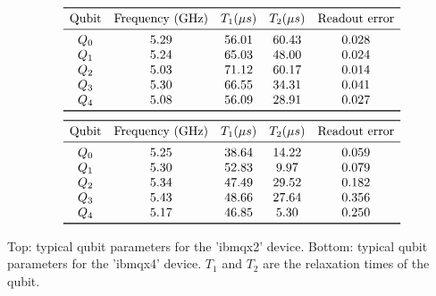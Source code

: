 \begin{center}
\begin{table}[h!]
\[
\begin{array}{*{5}c}
\toprule
\text{Qubit} 	&	\text{Frequency (GHz)}	&	T_1 ( \mu s)	&	T_2 ( \mu s)	&	\text{Readout error}	\\
\midrule
Q_0	&	5.29	&	56.01	&	60.43	&	0.028 \\
Q_1	&	5.24	&	65.03	&	48.00	&	0.024 \\
Q_2	&	5.03	&	71.12	&	60.17	&	0.014 \\
Q_3	&	5.30	&	66.55	&	34.31	&	0.041 \\
Q_4	&	5.08	&	56.09	&	28.91	&	0.027 \\
\bottomrule

\end{array}
\]
\[
\begin{array}{*{5}c}
\toprule
\text{Qubit} 	&	\text{Frequency (GHz)}	&	T_1 ( \mu s)	&	T_2 ( \mu s)	&	\text{Readout error}	\\
\midrule
Q_0	&	5.25	&	38.64	&	14.22	&	0.059 \\
Q_1	&	5.30	&	52.83	&	9.97	&	0.079 \\
Q_2	&	5.34	&	47.49	&	29.52	&	0.182 \\
Q_3	&	5.43	&	48.66	&	27.64	&	0.356\\
Q_4	&	5.17	&	46.85	&	5.30	&	0.250 \\
\bottomrule

\end{array}
\]

\caption{Top: typical qubit parameters for the 'ibmqx2' device. Bottom: typical qubit parameters for the 'ibmqx4' device. $T_1$ and $T_2$ are the relaxation times of the qubit. }
\label{IBMQX2_X4_parameters}
\end{table}
\end{center}










